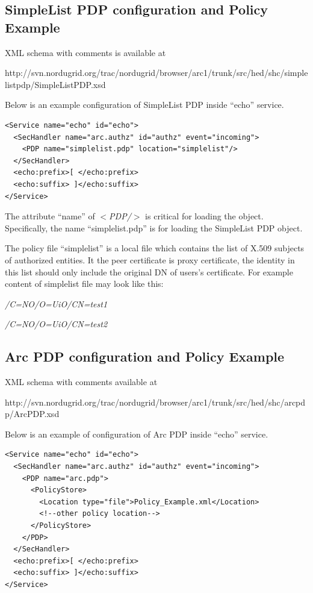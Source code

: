 \documentclass{article}                            %
\begin{document}
\subsection{SimpleList PDP configuration and Policy Example} %
\label{subsec:simplepdp_conf}
XML schema with comments is available at

http://svn.nordugrid.org/trac/nordugrid/browser/arc1/trunk/src/hed/shc/simplelistpdp/SimpleListPDP.xsd

Below is an example configuration of SimpleList PDP inside ``echo'' service.

\begin{verbatim}
<Service name="echo" id="echo">
  <SecHandler name="arc.authz" id="authz" event="incoming">
    <PDP name="simplelist.pdp" location="simplelist"/>
  </SecHandler>
  <echo:prefix>[ </echo:prefix>
  <echo:suffix> ]</echo:suffix>
</Service>
\end{verbatim}

The attribute ``name'' of \textit{$<$PDP/$>$} is critical for loading the object. Specifically, the name ``simplelist.pdp'' is for loading the SimpleList PDP object.

The policy file ``simplelist'' is a local file which contains the list of X.509 subjects of authorized entities. It the peer certificate is proxy certificate, the identity in this list should only include the original DN of users's certificate.
For example content of simplelist file may look like this:

\emph{/C=NO/O=UiO/CN=test1}

\emph{/C=NO/O=UiO/CN=test2}



\subsection{Arc PDP configuration and Policy Example} %
\label{subsec:arcpdp_conf}
XML schema with comments available at

http://svn.nordugrid.org/trac/nordugrid/browser/arc1/trunk/src/hed/shc/arcpdp/ArcPDP.xsd

Below is an example of configuration of Arc PDP inside ``echo'' service.
\begin{verbatim}
<Service name="echo" id="echo">
  <SecHandler name="arc.authz" id="authz" event="incoming">
    <PDP name="arc.pdp">
      <PolicyStore>
        <Location type="file">Policy_Example.xml</Location>
        <!--other policy location-->
      </PolicyStore>
    </PDP>
  </SecHandler>
  <echo:prefix>[ </echo:prefix>
  <echo:suffix> ]</echo:suffix>
</Service>
\end{verbatim}
\end{document}
